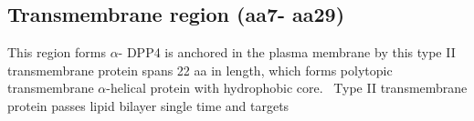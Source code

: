 \subsection{Transmembrane region (aa7- aa29)}

This region forms $\alpha$-
DPP4 is anchored in the plasma membrane by this type II transmembrane protein spans 22 aa in length, which forms polytopic transmembrane $\alpha$-helical protein with hydrophobic core.~\cite{Hong_1990} Type II transmembrane protein passes lipid bilayer single time and targets 


